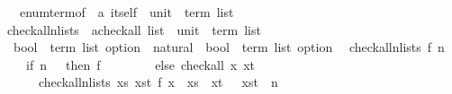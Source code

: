 \begin{isabellebody}
\ \ \ enum{\isacharunderscore}{\kern0pt}term{\isacharunderscore}{\kern0pt}of\ {\isacharcolon}{\kern0pt}{\isacharcolon}{\kern0pt}\ {\isachardoublequoteopen}{\isacharprime}{\kern0pt}a\ itself\ {\isasymRightarrow}\ unit\ {\isasymRightarrow}\ term\ list{\isachardoublequoteclose}\isanewline
\isanewline
{}\isamarkupfalse%
\ check{\isacharunderscore}{\kern0pt}all{\isacharunderscore}{\kern0pt}n{\isacharunderscore}{\kern0pt}lists\ {\isacharcolon}{\kern0pt}{\isacharcolon}{\kern0pt}\ {\isachardoublequoteopen}{\isacharparenleft}{\kern0pt}{\isacharprime}{\kern0pt}a{\isacharcolon}{\kern0pt}{\isacharcolon}{\kern0pt}check{\isacharunderscore}{\kern0pt}all\ list\ {\isasymtimes}\ {\isacharparenleft}{\kern0pt}unit\ {\isasymRightarrow}\ term\ list{\isacharparenright}{\kern0pt}\ {\isasymRightarrow}\isanewline
\ \ {\isacharparenleft}{\kern0pt}bool\ {\isasymtimes}\ term\ list{\isacharparenright}{\kern0pt}\ option{\isacharparenright}{\kern0pt}\ {\isasymRightarrow}\ natural\ {\isasymRightarrow}\ {\isacharparenleft}{\kern0pt}bool\ {\isacharasterisk}{\kern0pt}\ term\ list{\isacharparenright}{\kern0pt}\ option{\isachardoublequoteclose}\isanewline
{}\isanewline
\ \ {\isachardoublequoteopen}check{\isacharunderscore}{\kern0pt}all{\isacharunderscore}{\kern0pt}n{\isacharunderscore}{\kern0pt}lists\ f\ n\ {\isacharequal}{\kern0pt}\isanewline
\ \ \ \ {\isacharparenleft}{\kern0pt}if\ n\ {\isacharequal}{\kern0pt}\ {}\ then\ f\ {\isacharparenleft}{\kern0pt}{\isacharbrackleft}{\kern0pt}{\isacharbrackright}{\kern0pt}{\isacharcomma}{\kern0pt}\ {\isacharparenleft}{\kern0pt}{\isasymlambda}{\isacharunderscore}{\kern0pt}{\isachardot}{\kern0pt}\ {\isacharbrackleft}{\kern0pt}{\isacharbrackright}{\kern0pt}{\isacharparenright}{\kern0pt}{\isacharparenright}{\kern0pt}\isanewline
\ \ \ \ \ else\ check{\isacharunderscore}{\kern0pt}all\ {\isacharparenleft}{\kern0pt}{\isasymlambda}{\isacharparenleft}{\kern0pt}x{\isacharcomma}{\kern0pt}\ xt{\isacharparenright}{\kern0pt}{\isachardot}{\kern0pt}\isanewline
\ \ \ \ \ \ check{\isacharunderscore}{\kern0pt}all{\isacharunderscore}{\kern0pt}n{\isacharunderscore}{\kern0pt}lists\ {\isacharparenleft}{\kern0pt}{\isasymlambda}{\isacharparenleft}{\kern0pt}xs{\isacharcomma}{\kern0pt}\ xst{\isacharparenright}{\kern0pt}{\isachardot}{\kern0pt}\ f\ {\isacharparenleft}{\kern0pt}{\isacharparenleft}{\kern0pt}x\ {\isacharhash}{\kern0pt}\ xs{\isacharparenright}{\kern0pt}{\isacharcomma}{\kern0pt}\ {\isacharparenleft}{\kern0pt}{\isasymlambda}{\isacharunderscore}{\kern0pt}{\isachardot}{\kern0pt}\ {\isacharparenleft}{\kern0pt}xt\ {\isacharparenleft}{\kern0pt}{\isacharparenright}{\kern0pt}\ {\isacharhash}{\kern0pt}\ xst\ {\isacharparenleft}{\kern0pt}{\isacharparenright}{\kern0pt}{\isacharparenright}{\kern0pt}{\isacharparenright}{\kern0pt}{\isacharparenright}{\kern0pt}{\isacharparenright}{\kern0pt}\ {\isacharparenleft}{\kern0pt}n\ {\isacharminus}{\kern0pt}\ {}{\isacharparenright}{\kern0pt}{\isacharparenright}{\kern0pt}{\isacharparenright}{\kern0pt}{\isachardoublequoteclose}\isanewline

\end{isabellebody}
